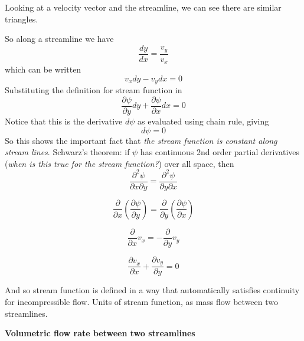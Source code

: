Looking at a velocity vector and the streamline, we can see there are similar triangles.


So along a streamline we have
\begin{equation*}
  \frac{dy}{dx}=\frac{v_{y}}{v_{x}}
\end{equation*}
which can be written
\begin{equation*}
  v_{x}dy-v_{y}dx=0
\end{equation*}
Substituting the definition for stream function in
\begin{equation*}
  \frac{\partial\psi}{\partial{}y}dy+\frac{\partial\psi}{\partial{}x}dx=0
\end{equation*}
Notice that this is the derivative $d\psi$ as evaluated using chain rule, giving
\begin{equation*}
  d\psi=0
\end{equation*}
So this shows the important fact that \textit{the stream function is constant along stream lines}.
Schwarz's theorem: if $\psi$ has continuous 2nd order partial derivatives (\textit{when is this true for the stream function?}) over all space, then
\begin{equation*}
  \frac{\partial^{2}\psi}{\partial{}x\partial{}y}=\frac{\partial^{2}\psi}{\partial{}y\partial{}x}
\end{equation*}

\begin{equation*}
  \frac{\partial}{\partial{}x}\left(\frac{\partial\psi}{\partial{}y}\right)=\frac{\partial}{\partial{}y}\left(\frac{\partial\psi}{\partial{}x}\right)
\end{equation*}

\begin{equation*}
  \frac{\partial}{\partial{}x}v_{x}=-\frac{\partial}{\partial{}y}v_{y}
\end{equation*}

\begin{equation*}
  \frac{\partial{}v_{x}}{\partial{}x}+\frac{\partial{}v_{y}}{\partial{}y}=0
\end{equation*}

And so stream function is defined in a way that automatically satisfies continuity for incompressible flow.
Units of stream function, as mass flow between two streamlines.

\begin{example}
  \textbf{Volumetric flow rate between two streamlines}
\end{example}

